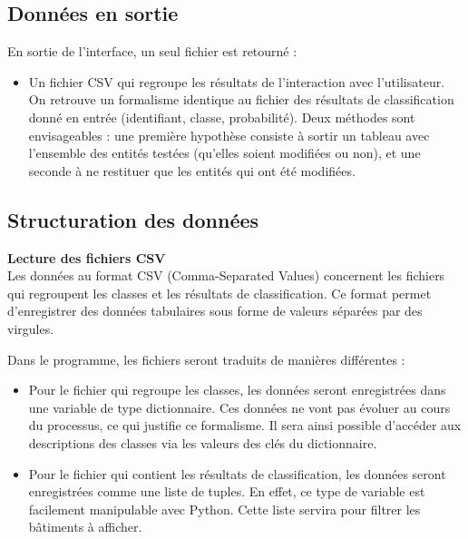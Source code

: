 \subsection{Données en sortie}

\noindent En sortie de l'interface, un seul fichier est retourné :
\begin{itemize}[label=$\rightarrow$]
	\item Un fichier CSV qui regroupe les résultats de l'interaction avec l'utilisateur. On retrouve un formalisme identique au fichier des résultats de classification donné en entrée (identifiant, classe, probabilité). Deux méthodes sont envisageables : une première hypothèse consiste à sortir un tableau avec l'ensemble des entités testées (qu'elles soient modifiées ou non), et une seconde à ne restituer que les entités qui ont été modifiées.\newline
\end{itemize}

\subsection{Structuration des données}

\noindent\textbf{Lecture des fichiers CSV}\\

Les données au format CSV (Comma-Separated Values) concernent les fichiers qui regroupent les classes et les résultats de classification. Ce format permet d’enregistrer des données tabulaires sous forme de valeurs séparées par des virgules. \newline

\noindent Dans le programme, les fichiers seront traduits de manières différentes :

\begin{itemize}[label=$\rightarrow$]
	\item Pour le fichier qui regroupe les classes, les données seront enregistrées dans une variable de type dictionnaire. Ces données ne vont pas évoluer au cours du processus, ce qui justifie ce formalisme. Il sera ainsi possible d'accéder aux descriptions des classes via les valeurs des clés du dictionnaire.
	\item Pour le fichier qui contient les résultats de classification, les données seront enregistrées comme une liste de tuples. En effet, ce type de variable est facilement manipulable avec Python. Cette liste servira pour filtrer les bâtiments à afficher.\\
\end{itemize}

